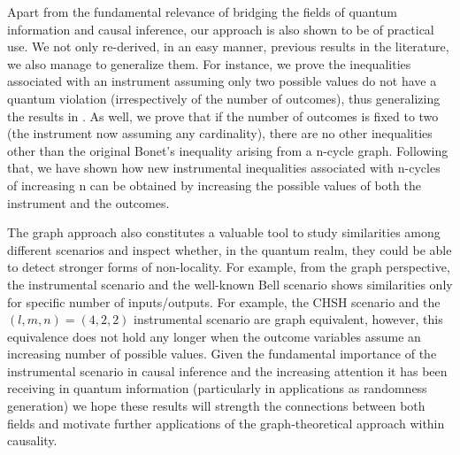 \documentclass[letterpaper]{article}
\begin{document}
Apart from the fundamental relevance of bridging the fields of quantum
information and causal inference, our approach is also shown to be of practical
use. We not only re-derived, in an easy manner, previous results in the literature,
we also manage to generalize them. For instance, we prove the inequalities
associated with an instrument assuming only two possible values do not have a
quantum violation (irrespectively of the number of outcomes), thus generalizing
the results in \cite{henson2014}. As well, we prove that if the number of
outcomes is fixed to two (the instrument now assuming any cardinality), there are no
other inequalities other than the original Bonet's inequality \cite{bonet2001} arising from a n-cycle graph. Following that, we have shown how new
instrumental inequalities associated with n-cycles of increasing n can be
obtained by increasing the possible values of both the instrument and the
outcomes.

The graph approach also constitutes a valuable tool to study similarities among
different scenarios and inspect whether, in the quantum realm, they could be
able to detect stronger forms of non-locality. For example, from the graph
perspective, the instrumental scenario and the well-known Bell scenario shows
similarities only for specific number of inputs/outputs. For example, the CHSH
scenario \cite{CHSH} and the $(l,m,n)=(4,2,2)$ instrumental scenario are graph
equivalent, however, this equivalence does not hold any longer when the outcome
variables assume an increasing number of possible values. Given the fundamental
importance of the instrumental scenario in causal inference and the increasing
attention it has been receiving in quantum information (particularly in
applications as randomness generation) we hope these results will strength the
connections between both fields and motivate further applications of the
graph-theoretical approach within causality.


\end{document}
